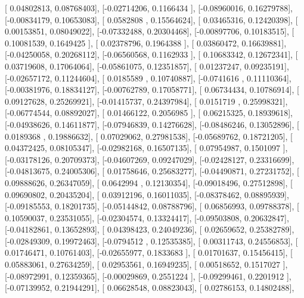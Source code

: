 \documentclass{article}
\begin{document}
       [ 0.04802813,  0.08768403],
       [-0.02714206,  0.1166434 ],
       [-0.08960016,  0.16279788],
       [-0.00834179,  0.10653083],
       [ 0.0582808 ,  0.15564624],
       [ 0.03465316,  0.12420398],
       [ 0.00153851,  0.08049022],
       [-0.07332488,  0.20304468],
       [-0.00897706,  0.10183515],
       [ 0.10081539,  0.1649425 ],
       [ 0.02378796,  0.1964388 ],
       [ 0.03860472,  0.16639881],
       [-0.04250058,  0.20268112],
       [-0.06560568,  0.1162933 ],
       [ 0.10683342,  0.12672341],
       [ 0.03719608,  0.17064064],
       [-0.05861075,  0.12351857],
       [ 0.01237247,  0.09235191],
       [-0.02657172,  0.11244604],
       [ 0.0185589 ,  0.10740887],
       [-0.0741616 ,  0.11110364],
       [-0.00381976,  0.18834127],
       [-0.00762789,  0.17058771],
       [ 0.06734434,  0.10786914],
       [ 0.09127628,  0.25269921],
       [-0.01415737,  0.24397984],
       [ 0.0151719 ,  0.25998321],
       [-0.06774544,  0.08892027],
       [ 0.01466122,  0.2056985 ],
       [ 0.06215325,  0.18939618],
       [-0.04938626,  0.14611877],
       [-0.07946839,  0.14276628],
       [-0.08486246,  0.13052896],
       [ 0.0189368 ,  0.19886632],
       [ 0.07029062,  0.27981538],
       [-0.05689762,  0.18721205],
       [ 0.04372425,  0.08105347],
       [-0.02982168,  0.16507135],
       [ 0.07954987,  0.1501097 ],
       [-0.03178126,  0.20709373],
       [-0.04607269,  0.09247029],
       [-0.02428127,  0.23316699],
       [-0.04813675,  0.24005306],
       [ 0.01758646,  0.25683277],
       [-0.04490871,  0.27231752],
       [ 0.09888626,  0.26347059],
       [ 0.0642994 ,  0.12130354],
       [-0.09018496,  0.27512898],
       [ 0.09690802,  0.20435204],
       [ 0.03912196,  0.16011035],
       [-0.08378462,  0.08895939],
       [-0.09185553,  0.18201735],
       [-0.05144842,  0.08788796],
       [ 0.06856993,  0.09788378],
       [ 0.10590037,  0.23531055],
       [-0.02304574,  0.13324417],
       [-0.09503808,  0.20632847],
       [-0.04182861,  0.13652893],
       [ 0.04398423,  0.24049236],
       [ 0.02659652,  0.25382789],
       [-0.02849309,  0.19972463],
       [-0.0794512 ,  0.12535385],
       [ 0.00311743,  0.24556853],
       [ 0.01746471,  0.10761403],
       [-0.02655977,  0.1833683 ],
       [ 0.01701637,  0.15456415],
       [ 0.05883061,  0.27634259],
       [ 0.02953561,  0.16949235],
       [ 0.00518652,  0.1517027 ],
       [-0.08972991,  0.12359365],
       [-0.00029869,  0.2551224 ],
       [-0.09299461,  0.2201912 ],
       [-0.07139952,  0.21944291],
       [ 0.06628548,  0.08823043],
       [ 0.02786153,  0.14802488],
\end{document}
